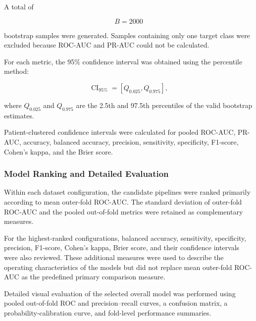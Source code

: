 \documentclass[12pt,twocolumn]{article}
\begin{document}
A total of

\begin{equation}
B=2000
\label{eq:number_of_bootstraps}
\end{equation}

bootstrap samples were generated. Samples containing only one target
class were excluded because ROC-AUC and PR-AUC could not be calculated.

For each metric, the 95\% confidence interval was obtained using the
percentile method:

\begin{equation}
\operatorname{CI}_{95\%}
=
\left[
Q_{0.025},
Q_{0.975}
\right],
\label{eq:bootstrap_percentile_ci}
\end{equation}

where \(Q_{0.025}\) and \(Q_{0.975}\) are the 2.5th and 97.5th
percentiles of the valid bootstrap estimates.

Patient-clustered confidence intervals were calculated for pooled
ROC-AUC, PR-AUC, accuracy, balanced accuracy, precision, sensitivity,
specificity, F1-score, Cohen's kappa, and the Brier score.









\subsubsection{Model Ranking and Detailed Evaluation}
\label{subsubsec:model_ranking}

Within each dataset configuration, the candidate pipelines were ranked
primarily according to mean outer-fold ROC-AUC. The standard deviation
of outer-fold ROC-AUC and the pooled out-of-fold metrics were retained
as complementary measures.

For the highest-ranked configurations, balanced accuracy, sensitivity,
specificity, precision, F1-score, Cohen's kappa, Brier score, and their
confidence intervals were also reviewed. These additional measures
were used to describe the operating characteristics of the models but
did not replace mean outer-fold ROC-AUC as the predefined primary
comparison measure.

Detailed visual evaluation of the selected overall model was performed
using pooled out-of-fold ROC and precision--recall curves, a confusion
matrix, a probability-calibration curve, and fold-level performance
summaries.
\end{document}
